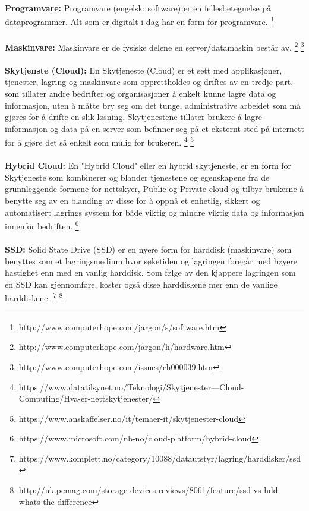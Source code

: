 \paragraph{} {\bfseries Programvare:} Programvare (engelsk: software) er en fellesbetegnelse på dataprogrammer. Alt som er digitalt i dag har en form for programvare. 
\footnote{http://www.computerhope.com/jargon/s/software.htm}

\paragraph{} {\bfseries Maskinvare:} Maskinvare er de fysiske delene en server/datamaskin består av.
\footnote{http://www.computerhope.com/jargon/h/hardware.htm}
\footnote{http://www.computerhope.com/issues/ch000039.htm}

\paragraph{} {\bfseries Skytjenste (Cloud):} En Skytjeneste (Cloud) er et sett med applikasjoner, tjenester, lagring og maskinvare som opprettholdes og driftes av en tredje-part, som tillater andre bedrifter og organisasjoner å enkelt kunne lagre data og informasjon, uten å måtte bry seg om det tunge, administrative arbeidet som må gjøres for å drifte en slik løsning. Skytjenestene tillater brukere å lagre informasjon og data på en server som befinner seg på et eksternt sted på internett for å gjøre det så enkelt som mulig for brukeren.
\footnote{https://www.datatilsynet.no/Teknologi/Skytjenester---Cloud-Computing/Hva-er-nettskytjenester/}
\footnote{https://www.anskaffelser.no/it/temaer-it/skytjenester-cloud}

\paragraph{} {\bfseries Hybrid Cloud:} En "Hybrid Cloud" eller en hybrid skytjeneste, er en form for Skytjeneste som kombinerer og blander tjenestene og egenskapene fra de grunnleggende formene for nettskyer, Public og Private cloud og tilbyr brukerne å benytte seg av en blanding av disse for å oppnå et enhetlig, sikkert og automatisert lagrings system for både viktig og mindre viktig data og informasjon innenfor bedriften.
\footnote{https://www.microsoft.com/nb-no/cloud-platform/hybrid-cloud}

\paragraph{} {\bfseries SSD:} Solid State Drive (SSD) er en nyere form for harddisk (maskinvare) som benyttes som et lagringsmedium hvor søketiden og lagringen foregår med høyere hastighet enn med en vanlig harddisk. Som følge av den kjappere lagringen som en SSD kan gjennomføre, koster også disse harddiskene mer enn de vanlige harddiskene.
\footnote{https://www.komplett.no/category/10088/datautstyr/lagring/harddisker/ssd}
\footnote{http://uk.pcmag.com/storage-devices-reviews/8061/feature/ssd-vs-hdd-whats-the-difference}

